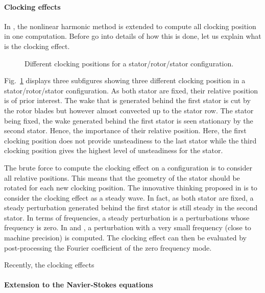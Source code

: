 \paragraph{Clocking effects}
In \citet{He2002}, the nonlinear harmonic method is extended to
compute all clocking position in one computation. Before
go into details of how this is done, let us explain what is
the clocking effect.
\begin{figure}[htbp]
  \centering 
  \caption{Different clocking positions for a stator/rotor/stator
  configuration.}
  \label{fig:sm_nlh_clocking_effect}
\end{figure}
Fig.~\ref{fig:sm_nlh_clocking_effect} displays three subfigures showing three
different clocking position in a stator/rotor/stator configuration.
As both stator are fixed, their relative position is of 
prior interest. The wake that is generated behind the first stator
is cut by the rotor blades but however almost convected up to 
the stator row. The stator being fixed, the wake generated
behind the first stator is seen stationary by the second stator.
Hence, the importance of their relative position. Here, the
first clocking position does not provide unsteadiness to the
last stator while the third clocking position gives the highest
level of unsteadiness for the stator. 

The brute force to compute the clocking effect on a
configuration is to consider all relative positions. This means
that the geometry of the stator should be rotated for each new 
clocking position. The innovative thinking proposed in 
\citet{He2002} is to consider the clocking effect as a steady wave.
In fact, as both stator are fixed, a steady perturbation
generated behind the first stator is still steady in the second stator.
In terms of frequencies, a steady perturbation is a perturbations 
whose frequency is zero. In \citet{He2002} and \cite{Vilmin2009}, 
a perturbation with a very small frequency (close to machine precision)
is computed. The clocking effect can then be evaluated by
post-processing the Fourier coefficient of the zero frequency mode.

Recently, the clocking effects \citet{Vilmin2013a}

\paragraph{Extension to the Navier-Stokes equations}


